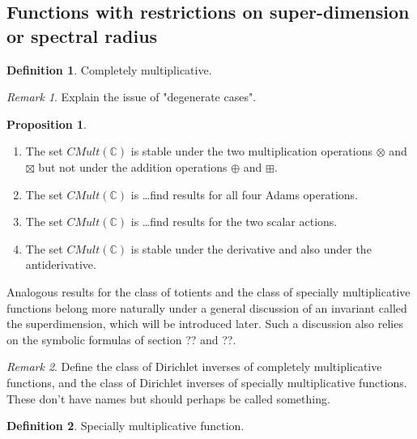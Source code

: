\documentclass[a4paper]{article}
\theoremstyle{definition}
\newtheorem{definition}{Definition}[section]
\newtheorem{proposition}[theorem]{Proposition}
\theoremstyle{remark}
\newtheorem*{remark}{Remark}
\newcommand{\C}{\mathbb{C}}
\begin{document}
\subsection{Functions with restrictions on super-dimension or spectral radius}



\begin{definition}
Completely multiplicative.
\end{definition}

\begin{remark}
Explain the issue of "degenerate cases".
\end{remark}

\begin{proposition}
\begin{enumerate}
\item The set $CMult(\C)$ is stable under the two multiplication operations $\otimes$ and $\boxtimes$ but not under the addition operations $\oplus$ and $\boxplus$.
\item The set $CMult(\C)$ is \ldots find results for all four Adams operations.
\item The set $CMult(\C)$ is \ldots find results for the two scalar actions.
\item The set $CMult(\C)$ is stable under the derivative and also under the antiderivative.
\end{enumerate}
\end{proposition}

Analogous results for the class of totients and the class of specially multiplicative functions belong more naturally under a general discussion of an invariant called the superdimension, which will be introduced later. Such a discussion also relies on the symbolic formulas of section ?? and ??.




\begin{remark}
Define the class of Dirichlet inverses of completely multiplicative functions, and the class of Dirichlet inverses of specially multiplicative functions. These don't have names but should perhaps be called something.
\end{remark}



\begin{definition}
Specially multiplicative function.
\end{definition}
\end{document}
